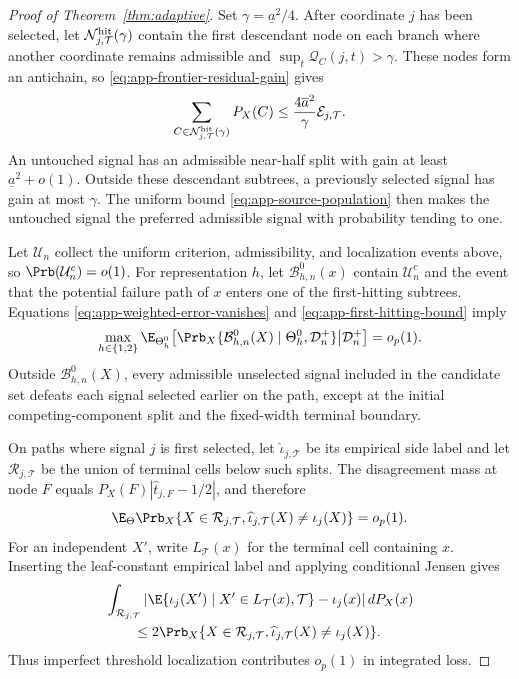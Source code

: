 \begin{appendix}
\begin{proof}[Proof of Theorem~\ref{thm:adaptive}]
Set \(\gamma=\underline a^2/4\). After coordinate \(j\) has been selected,
let \(\mathcal N_{j,\mathcal T}^{\rm hit}(\gamma)\) contain the first descendant
node on each branch where another coordinate remains admissible and
\(\sup_t\mathcal Q_C(j,t)>\gamma\). These nodes form an antichain, so
\eqref{eq:app-frontier-residual-gain} gives
\begin{equation}\label{eq:app-first-hitting-bound}
\sum_{C\in\mathcal N_{j,\mathcal T}^{\rm hit}(\gamma)}P_X(C)
\le\frac{4\overline a^2}{\gamma}\mathcal E_{j,\mathcal T}.
\end{equation}
An untouched signal has an admissible near-half split with gain at least
\(\underline a^2+o(1)\). Outside these descendant subtrees, a previously
selected signal has gain at most \(\gamma\). The uniform bound
\eqref{eq:app-source-population} then makes the untouched signal the preferred
admissible signal with probability tending to one.

Let \(\mathcal U_n\) collect the uniform criterion, admissibility, and
localization events above, so \(\Prb(\mathcal U_n^c)=o(1)\). For representation
\(h\), let \(\mathcal B_{h,n}^0(x)\) contain \(\mathcal U_n^c\) and the event
that the potential failure path of \(x\) enters one of the first-hitting
subtrees. Equations \eqref{eq:app-weighted-error-vanishes} and
\eqref{eq:app-first-hitting-bound} imply
\begin{equation}\label{eq:app-adaptive-resolution}
\max_{h\in\{1,2\}}
\E_{\Theta_h^0}\!\left[
\Prb_X\{\mathcal B_{h,n}^0(X)\mid\Theta_h^0,\mathcal D_n^+\}
\middle|\mathcal D_n^+\right]=o_p(1).
\end{equation}
Outside \(\mathcal B_{h,n}^0(X)\), every admissible unselected signal included
in the candidate set defeats each signal selected earlier on the path, except
at the initial competing-component split and the fixed-width terminal boundary.

On paths where signal \(j\) is first selected, let
\(\widehat\iota_{j,\mathcal T}\) be its empirical side label and let
\(\mathcal R_{j,\mathcal T}\) be the union of terminal cells below such splits.
The disagreement mass at node \(F\) equals
\(P_X(F)|\widehat t_{j,F}-1/2|\), and therefore
\begin{equation*}
\E_\Theta\Prb_X\{X\in\mathcal R_{j,\mathcal T},
\widehat\iota_{j,\mathcal T}(X)\ne \iota_j(X)\}=o_p(1).
\end{equation*}
For an independent \(X'\), write \(L_{\mathcal T}(x)\) for the terminal cell
containing \(x\). Inserting the leaf-constant empirical label and applying
conditional Jensen gives
\begin{align}
&\int_{\mathcal R_{j,\mathcal T}}
\left|
\E\{\iota_j(X')\mid X'\in L_{\mathcal T}(x),\mathcal T\}-\iota_j(x)
\right|dP_X(x)\notag\\
&\qquad\le
2\Prb_X\{X\in\mathcal R_{j,\mathcal T},
\widehat\iota_{j,\mathcal T}(X)\ne \iota_j(X)\}.
\label{eq:app-leaf-contamination}
\end{align}
Thus imperfect threshold localization contributes \(o_p(1)\) in integrated
loss.


\end{proof}
\end{appendix}
